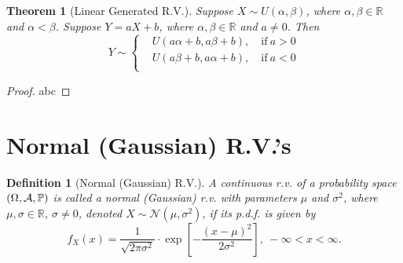 \documentclass[openany,12pt]{book}
\newtheorem{theorem}{Theorem}[chapter]
\newtheorem{definition}{Definition}[chapter]
\begin{document}
\begin{theorem}[Linear Generated R.V.]
Suppose $X\sim U(\alpha,\beta)$, where $\alpha,\beta\in\mathbb{R}$ and $\alpha<\beta$. Suppose $Y=aX+b$, where $\alpha,\beta\in\mathbb{R}$ and $a\neq0$. Then
\[Y\sim\left\{ \begin{aligned}
&U\left( a\alpha + b,a\beta + b \right),\quad\mathrm{\text{if}}\ a > 0 \\
&U\left( a\beta + b,a\alpha + b \right),\quad\mathrm{\text{if}}\ a < 0 \\
\end{aligned} \right.\]
\end{theorem}

\begin{proof}
  abc
\end{proof}

\section{Normal (Gaussian) R.V.'s}

\begin{definition}[Normal (Gaussian) R.V.]
A continuous r.v. of a probability space $(\Omega,\mathcal{A},\mathbb{P})$ is called a normal (Gaussian) r.v. with parameters $\mu$ and $\sigma^2$, where $\mu,\sigma\in\mathbb{R}$, $\sigma\neq0$, denoted $X\sim \mathcal{N}(\mu,\sigma^2)$, if its p.d.f. is given by
$$
f_X(x)=\frac{1}{\sqrt{2\pi\sigma^2}}\cdot\exp\left[{-\frac{(x-\mu)^2}{2\sigma^2}}\right],\ -\infty<x<\infty.
$$
\end{definition}
\end{document}

